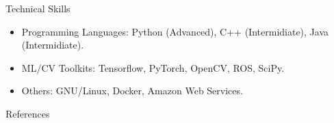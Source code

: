 \documentclass[]{mcdowellcv}
\begin{document}
	
	
	
	\begin{cvsection}{Technical Skills}
		\begin{cvsubsection}{}{}{}    
			\begin{itemize}
				\item Programming Languages: Python (Advanced), C++ (Intermidiate), Java (Intermidiate).
				\item ML/CV Toolkits: Tensorflow, PyTorch, OpenCV, ROS, SciPy.
				\item Others: GNU/Linux, Docker, Amazon Web Services.
			\end{itemize}
		\end{cvsubsection}
	\end{cvsection}
	
	\begin{cvsection}{References}
		
		\printbibliography[heading=none]
		
	\end{cvsection}
	
\end{document}
